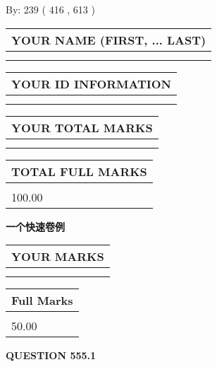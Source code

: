 \documentclass{ctexart}
\begin{document}
   
\hspace{1.0in} By: 
 239 ( 416 ,  613 )
   
   
   
   
\newpage 
\setcounter{page}{ 
   555001 } 
   
   
   
   
\noindent\begin{tabular}{|l|}
\hline
YOUR NAME (FIRST, ... LAST)  \\
\hline
 \\ 
 \\ 
\hline
\end{tabular}
\hspace{0.05in} \begin{tabular}{|l|}
\hline
 YOUR   ID   INFORMATION  \\
\hline
 \\ 
 \\ 
\hline
\end{tabular}
   
   
\vspace{0.2in}\noindent\begin{tabular}{|l|}
\hline
YOUR TOTAL MARKS  \\
\hline
 \\ 
 \\ 
\hline
\end{tabular}
\hspace{0.05in} \begin{tabular}{|l|}
\hline
TOTAL FULL MARKS  \\
\hline
 \\ 
100.00 \\
\hline
\end{tabular}
   
   
 \vspace{0.2in}
{\LARGE {\textbf{ 一个快速卷例}}}
   
   
  
\vspace{0.2in}
  
\noindent\begin{tabular}{|l|}
\hline
 YOUR MARKS  \\
\hline
 \\ 
 \\ 
\hline
\end{tabular}
\hspace{0.05in} \begin{tabular}{|l|}
\hline
 Full Marks  \\
\hline
 \\ 
50.00 \\
\hline
\end{tabular}
{\textbf{\Large{QUESTION
555.1 
}}}
  
\end{document}
